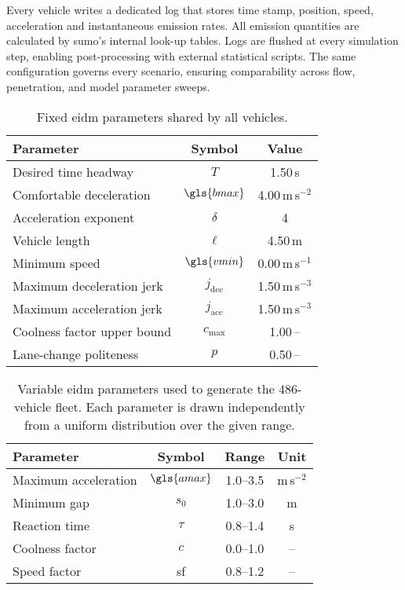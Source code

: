 \mynewline
Every vehicle writes a dedicated log that stores time stamp, position, speed, acceleration and instantaneous emission rates. All emission quantities are calculated by \ac{sumo}’s internal look-up tables. Logs are flushed at every simulation step, enabling post-processing with external statistical scripts. The same configuration governs every scenario, ensuring comparability across flow, penetration, and model parameter sweeps.

\begin{table}[tbp]
  \centering
  \caption{Fixed \ac{eidm} parameters shared by all vehicles.}
  \label{tab:EIDMFixed}
  \begin{tabular}{lcc}
    \toprule
    Parameter & Symbol & Value \\
    \midrule
    Desired time headway           & \(T\)               & 1.50\,s \\
    Comfortable deceleration       & \(\gls{bmax}\)      & 4.00\,m\,s\(^{-2}\) \\
    Acceleration exponent          & \(\delta\)          & 4 \\
    Vehicle length                 & \(\ell\)            & 4.50\,m \\
    Minimum speed                  & \(\gls{vmin}\)      & 0.00\,m\,s\(^{-1}\) \\
    Maximum deceleration jerk      & \(j_{\text{dec}}\)  & 1.50\,m\,s\(^{-3}\) \\
    Maximum acceleration jerk      & \(j_{\text{acc}}\)  & 1.50\,m\,s\(^{-3}\) \\
    Coolness factor upper bound    & \(c_{\max}\)        & 1.00\,– \\
    Lane-change politeness         & \(p\)               & 0.50\,– \\
    \bottomrule
  \end{tabular}
\end{table}

\begin{table}[tbp]
  \centering
  \caption{Variable \ac{eidm} parameters used to generate the 486-vehicle fleet.  Each parameter is drawn independently from a uniform distribution over the given range.}
  \label{tab:EIDMVar}
  \begin{tabular}{lccc}
    \toprule
    Parameter                    & Symbol         & Range        & Unit \\
    \midrule
    Maximum acceleration         & \(\gls{amax}\) & 1.0–3.5      & m\,s\(^{-2}\) \\
    Minimum gap                  & \(s_{0}\)      & 1.0–3.0      & m \\
    Reaction time                & \(\tau\)       & 0.8–1.4      & s \\
    Coolness factor              & \(c\)          & 0.0–1.0      & – \\
    Speed factor                 & \gls{sf}       & 0.8–1.2      & – \\
    \bottomrule
  \end{tabular}
\end{table}